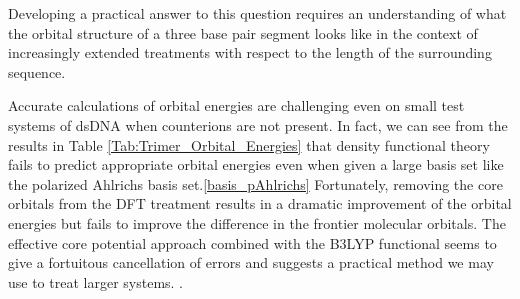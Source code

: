 Developing a practical answer to this question requires an
understanding of what the orbital structure of a three base pair
segment looks like in the context of increasingly extended treatments
with respect to the length of the surrounding sequence.

Accurate calculations of orbital energies are challenging even on
small test systems of dsDNA when counterions are not present.  In
fact, we can see from the results in  Table
\ref{Tab:Trimer_Orbital_Energies} that density functional theory fails
to predict appropriate orbital energies even when given a large basis
set like the polarized Ahlrichs basis set.\ref{basis_pAhlrichs}
Fortunately, removing the core orbitals from the DFT treatment results
in a dramatic improvement of the orbital energies but fails to improve
the difference in the frontier molecular orbitals.  The effective core
potential approach combined with the B3LYP functional seems to give a
fortuitous cancellation of errors and suggests a practical method we
may use to treat larger systems. .


